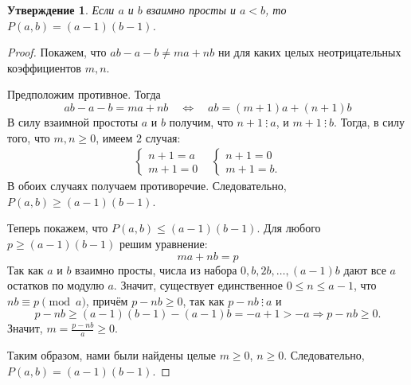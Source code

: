 \documentclass[12pt]{article}
\newtheorem{proposition}[theorem]{Утверждение}
\theoremstyle{definition}
\begin{document}
\begin{proposition}
Если $a$ и $b$ взаимно просты и $a < b$, то $P(a, b) = (a - 1)(b - 1)$.
\end{proposition}
\begin{proof}
Покажем, что $ab - a - b \ne ma + nb$ ни для каких целых неотрицательных коэффициентов $m, n$.

Предположим противное. Тогда \begin{equation*}
ab - a - b = ma + nb \quad \Longleftrightarrow \quad ab = (m + 1)a + (n + 1) b
\end{equation*}
В силу взаимной простоты $a$ и $b$ получим, что $n + 1 \ \vdots \ a$, и $m + 1 \ \vdots \ b$. Тогда, в силу того, что $m, n \ge 0$, имеем $2$ случая:\begin{align*}
     \begin{cases}
        n + 1 = a\\
        m + 1 = 0
    \end{cases}
    &
    \begin{cases}
        n + 1 = 0\\
        m + 1 = b.
    \end{cases}
\end{align*}
В обоих случаях получаем противоречие. Следовательно, $P(a, b) \ge (a - 1)(b - 1)$.

Теперь покажем, что $P(a, b) \le (a - 1)(b - 1)$. Для любого $p \ge (a - 1)(b - 1)$ решим уравнение: \begin{equation*}
ma + nb = p
\end{equation*}
Так как $a$ и $b$ взаимно просты, числа из набора $0, b, 2b, \dots, (a - 1)b$ дают все $a$ остатков по модулю $a$. Значит, существует единственное $0 \le n \le a - 1$, что $nb \equiv p \pmod a$, причём $p - nb \ge 0$, так как $p - nb \ \vdots \ a$ и
\begin{equation*}
p - nb \ge (a - 1)(b - 1) - (a - 1)b = -a + 1 > -a \Longrightarrow p - nb \ge 0.
\end{equation*}
Значит, $m = \frac{p - nb}{a} \ge 0$.

Таким образом, нами были найдены целые $m \ge 0$, $n \ge 0$. Следовательно, $P(a, b) = (a - 1)(b - 1)$.
\end{proof}
\end{document}
